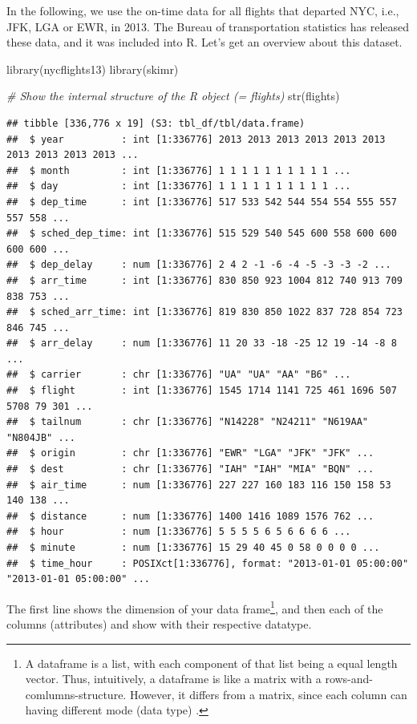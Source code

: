 \documentclass[
]{book}
\newenvironment{Shaded}{\begin{snugshade}}{\end{snugshade}}
\newcommand{\CommentTok}[1]{\textcolor[rgb]{0.56,0.35,0.01}{\textit{#1}}}
\newcommand{\FunctionTok}[1]{\textcolor[rgb]{0.00,0.00,0.00}{#1}}
\newcommand{\NormalTok}[1]{#1}
\begin{document}
In the following, we use the on-time data for all flights that departed NYC, i.e., JFK, LGA or EWR, in 2013. The Bureau of transportation statistics has released these data, and it was included into R. Let's get an overview about this dataset.

\begin{Shaded}
\begin{Highlighting}[]
\FunctionTok{library}\NormalTok{(nycflights13)}
\FunctionTok{library}\NormalTok{(skimr)}

\CommentTok{\# Show the internal structure of the R object (= flights)}
\FunctionTok{str}\NormalTok{(flights)}
\end{Highlighting}
\end{Shaded}

\begin{verbatim}
## tibble [336,776 x 19] (S3: tbl_df/tbl/data.frame)
##  $ year          : int [1:336776] 2013 2013 2013 2013 2013 2013 2013 2013 2013 2013 ...
##  $ month         : int [1:336776] 1 1 1 1 1 1 1 1 1 1 ...
##  $ day           : int [1:336776] 1 1 1 1 1 1 1 1 1 1 ...
##  $ dep_time      : int [1:336776] 517 533 542 544 554 554 555 557 557 558 ...
##  $ sched_dep_time: int [1:336776] 515 529 540 545 600 558 600 600 600 600 ...
##  $ dep_delay     : num [1:336776] 2 4 2 -1 -6 -4 -5 -3 -3 -2 ...
##  $ arr_time      : int [1:336776] 830 850 923 1004 812 740 913 709 838 753 ...
##  $ sched_arr_time: int [1:336776] 819 830 850 1022 837 728 854 723 846 745 ...
##  $ arr_delay     : num [1:336776] 11 20 33 -18 -25 12 19 -14 -8 8 ...
##  $ carrier       : chr [1:336776] "UA" "UA" "AA" "B6" ...
##  $ flight        : int [1:336776] 1545 1714 1141 725 461 1696 507 5708 79 301 ...
##  $ tailnum       : chr [1:336776] "N14228" "N24211" "N619AA" "N804JB" ...
##  $ origin        : chr [1:336776] "EWR" "LGA" "JFK" "JFK" ...
##  $ dest          : chr [1:336776] "IAH" "IAH" "MIA" "BQN" ...
##  $ air_time      : num [1:336776] 227 227 160 183 116 150 158 53 140 138 ...
##  $ distance      : num [1:336776] 1400 1416 1089 1576 762 ...
##  $ hour          : num [1:336776] 5 5 5 5 6 5 6 6 6 6 ...
##  $ minute        : num [1:336776] 15 29 40 45 0 58 0 0 0 0 ...
##  $ time_hour     : POSIXct[1:336776], format: "2013-01-01 05:00:00" "2013-01-01 05:00:00" ...
\end{verbatim}

The first line shows the dimension of your data frame\footnote{A dataframe is a list, with each component of that list being a equal length vector. Thus, intuitively, a dataframe is like a matrix with a rows-and-comlumns-structure. However, it differs from a matrix, since each column can having different mode (data type) \citep{Matloff2011ArtofRProgramming}.}, and then each of the columns (attributes) and show with their respective datatype.
\end{document}

